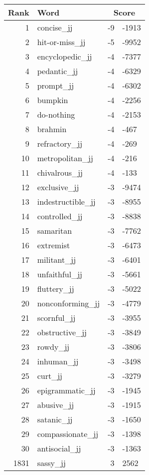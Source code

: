 \begin{longtable}[!htbp]{| rlr@{.}l |}
    \hline
    \textbf{Rank} & \textbf{Word} & \multicolumn{2}{c|}{\textbf{Score}} \\
    \hline
    \endhead
    1 & concise\_jj & -9 & -1913 \\
    2 & hit-or-miss\_jj & -5 & -9952 \\
    3 & encyclopedic\_jj & -4 & -7377 \\
    4 & pedantic\_jj & -4 & -6329 \\
    5 & prompt\_jj & -4 & -6302 \\
    6 & bumpkin & -4 & -2256 \\
    7 & do-nothing & -4 & -2153 \\
    8 & brahmin & -4 & -467 \\
    9 & refractory\_jj & -4 & -269 \\
    10 & metropolitan\_jj & -4 & -216 \\
    11 & chivalrous\_jj & -4 & -133 \\
    12 & exclusive\_jj & -3 & -9474 \\
    13 & indestructible\_jj & -3 & -8955 \\
    14 & controlled\_jj & -3 & -8838 \\
    15 & samaritan & -3 & -7762 \\
    16 & extremist & -3 & -6473 \\
    17 & militant\_jj & -3 & -6401 \\
    18 & unfaithful\_jj & -3 & -5661 \\
    19 & fluttery\_jj & -3 & -5022 \\
    20 & nonconforming\_jj & -3 & -4779 \\
    21 & scornful\_jj & -3 & -3955 \\
    22 & obstructive\_jj & -3 & -3849 \\
    23 & rowdy\_jj & -3 & -3806 \\
    24 & inhuman\_jj & -3 & -3498 \\
    25 & curt\_jj & -3 & -3279 \\
    26 & epigrammatic\_jj & -3 & -1945 \\
    27 & abusive\_jj & -3 & -1915 \\
    28 & satanic\_jj & -3 & -1650 \\
    29 & compassionate\_jj & -3 & -1398 \\
    30 & antisocial\_jj & -3 & -1363 \\
    1831 & sassy\_jj & 3 & 2562 \\

\end{longtable}
